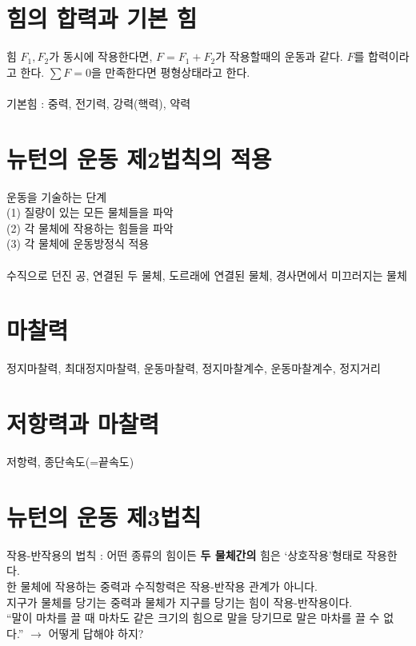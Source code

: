 \documentclass[10pt,a4paper]{report}
\begin{document}
	\section{힘의 합력과 기본 힘}
	
	힘 $F_1, F_2$가 동시에 작용한다면, $F = F_1 + F_2$가 작용할때의 운동과 같다. $F$를 합력이라고 한다. $\sum F = 0$을 만족한다면 평형상태라고 한다.\\
	\\
	기본힘 : 중력, 전기력, 강력(핵력), 약력
	
	\section{뉴턴의 운동 제2법칙의 적용}
	
	운동을 기술하는 단계\\
	(1) 질량이 있는 모든 물체들을 파악\\
	(2) 각 물체에 작용하는 힘들을 파악\\
	(3) 각 물체에 운동방정식 적용\\
	\\
	수직으로 던진 공, 연결된 두 물체, 도르래에 연결된 물체, 경사면에서 미끄러지는 물체
	
	\section{마찰력}
	
	정지마찰력, 최대정지마찰력, 운동마찰력, 정지마찰계수, 운동마찰계수, 정지거리
	
	\section{저항력과 마찰력}
	
	저항력, 종단속도(=끝속도)
	
	\section{뉴턴의 운동 제3법칙}
	
	작용-반작용의 법칙 : 어떤 종류의 힘이든 \textbf{두 물체간의} 힘은 `상호작용'형태로 작용한다.\\
	한 물체에 작용하는 중력과 수직항력은 작용-반작용 관계가 아니다.\\
	지구가 물체를 당기는 중력과 물체가 지구를 당기는 힘이 작용-반작용이다.\\
	``말이 마차를 끌 때 마차도 같은 크기의 힘으로 말을 당기므로 말은 마차를 끌 수 없다.'' $\rightarrow$ 어떻게 답해야 하지?
	
\end{document}
